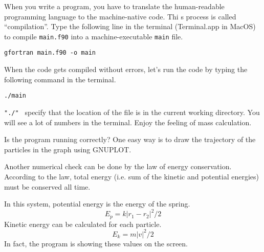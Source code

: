 \documentclass[a4,10pt]{article}
\begin{document}
When you write a program, you have to translate the human-readable
programming language to the machine-native code.  Thi s process is
called ``compilation''.  Type the following line in the terminal
(Terminal.app in MacOS) to compile {\tt main.f90} into a
machine-executable {\tt main} file.
\begin{screen}
\begin{verbatim}
gfortran main.f90 -o main
\end{verbatim}
\end{screen}

When the code gets compiled without errors, let's run the code by
typing the following command in the terminal.
\begin{screen}
\begin{verbatim}
./main
\end{verbatim}
\end{screen}
{\tt "./" } specify that the location of the file is in the current
working directory.  You will see a lot of numbers in the terminal.
Enjoy the feeling of mass calculation.

Is the program running correctly?  One easy way is to draw the
trajectory of the particles in the graph using GNUPLOT.

Another numerical check can be done by the law of energy
conservation.  According to the law, total energy (i.e. sum of the
kinetic and potential energies) must be conserved all time.

In this system, potential energy is the energy of the spring.
\begin{equation}\label{eq:e_sp}
E_p = k \left| r_1 - r_2 \right|^2 / 2
\end{equation}
Kinetic energy can be calculated for each particle.
\begin{equation}
E_k = m \left| v \right|^2 / 2
\end{equation}
In fact, the program is showing these values on the screen.
\end{document}
